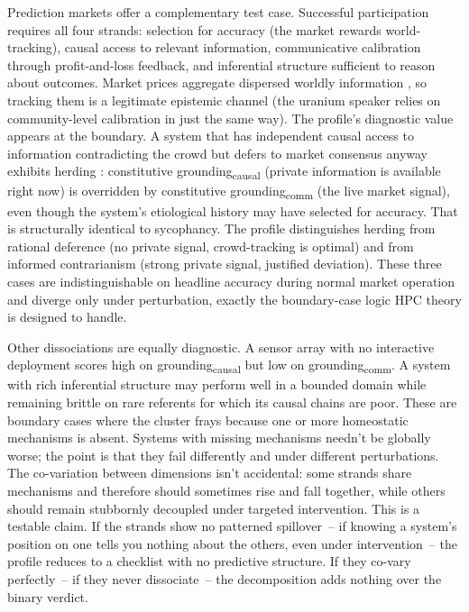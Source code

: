 \documentclass[12pt]{article}
\newcommand{\gcausal}{grounding\textsubscript{causal}}
\newcommand{\gcomm}{grounding\textsubscript{comm}}
\begin{document}
Prediction markets offer a complementary test case. Successful participation requires all four strands: selection for accuracy (the market rewards world-tracking), causal access to relevant information, communicative calibration through profit-and-loss feedback, and inferential structure sufficient to reason about outcomes. Market prices aggregate dispersed worldly information \citep{hayek_1945_use_of_knowledge}, so tracking them is a legitimate epistemic channel (the uranium speaker relies on community-level calibration in just the same way). The profile's diagnostic value appears at the boundary. A system that has independent causal access to information contradicting the crowd but defers to market consensus anyway exhibits herding \citep{scharfstein_stein_1990_herd_behavior}: constitutive \gcausal{} (private information is available right now) is overridden by constitutive \gcomm{} (the live market signal), even though the system's etiological history may have selected for accuracy. That is structurally identical to sycophancy. The profile distinguishes herding from rational deference (no private signal, crowd-tracking is optimal) and from informed contrarianism (strong private signal, justified deviation). These three cases are indistinguishable on headline accuracy during normal market operation and diverge only under perturbation, exactly the boundary-case logic HPC theory is designed to handle.

Other dissociations are equally diagnostic. A sensor array with no interactive deployment scores high on \gcausal{} but low on \gcomm{}. A system with rich inferential structure may perform well in a bounded domain while remaining brittle on rare referents for which its causal chains are poor. These are boundary cases where the cluster frays because one or more homeostatic mechanisms is absent. Systems with missing mechanisms needn't be globally worse; the point is that they fail differently and under different perturbations. The co-variation between dimensions isn't accidental: some strands share mechanisms and therefore should sometimes rise and fall together, while others should remain stubbornly decoupled under targeted intervention. This is a testable claim. If the strands show no patterned spillover~-- if knowing a system's position on one tells you nothing about the others, even under intervention~-- the profile reduces to a checklist with no predictive structure. If they co-vary perfectly~-- if they never dissociate~-- the decomposition adds nothing over the binary verdict.
\end{document}
